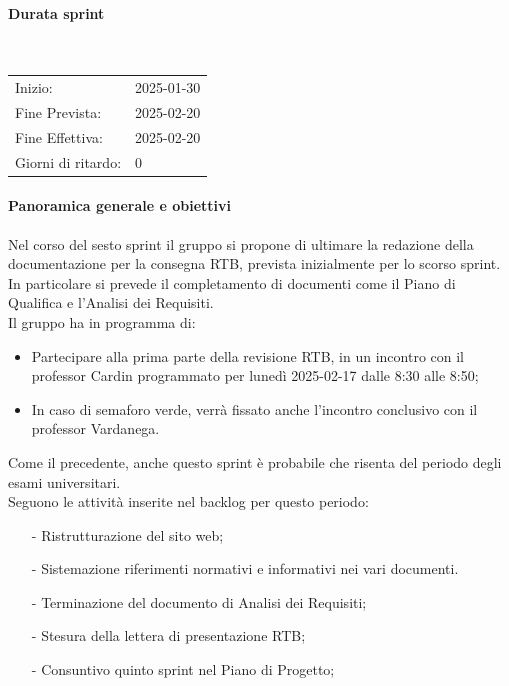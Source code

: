 \documentclass[10pt]{article}
\begin{document}
{{{{{{    \paragraph{Durata sprint}\mbox{}\\
    \vspace{-1.5em}
    \begin{table}[h] 
    \renewcommand{\arraystretch}{1.2}  
    \begin{tabular}{ l l }
        Inizio: & 2025-01-30 \\
        Fine Prevista: & 2025-02-20 \\
        Fine Effettiva: & 2025-02-20 \\
        Giorni di ritardo: & 0 \\
    \end{tabular}
    \end{table}
    \vspace{-2em}
    {\renewcommand{\arraystretch}{1.5}%
    
    \paragraph{Panoramica generale e obiettivi}\mbox{}\vspace{0.4em}

    Nel corso del sesto sprint il gruppo si propone di ultimare la redazione della documentazione per la consegna RTB, prevista inizialmente per lo scorso sprint.
    In particolare si prevede il completamento di documenti come il Piano di Qualifica e l'Analisi dei Requisiti.
    \\
    Il gruppo ha in programma di:
    \begin{itemize}
        \item Partecipare alla prima parte della revisione RTB, in un incontro con il professor Cardin programmato per lunedì 2025-02-17 dalle 8:30 alle 8:50;
        \item In caso di semaforo verde, verrà fissato anche l'incontro conclusivo con il professor Vardanega.
    \end{itemize}
    Come il precedente, anche questo sprint è probabile che risenta del periodo degli esami universitari.\\

    Seguono le attività inserite nel backlog per questo periodo:
    \vspace{-0.5em}
    \begin{itemize}
    \setlength\itemsep{-0.2em}
    \item [-] Ristrutturazione del sito web;
    \item [-] Sistemazione riferimenti normativi e informativi nei vari documenti.
    \item [-] Terminazione del documento di Analisi dei Requisiti;
    \item [-] Stesura della lettera di presentazione RTB;
    \item [-] Consuntivo quinto sprint nel Piano di Progetto;


\end{itemize}}}}}}}}
\end{document}
